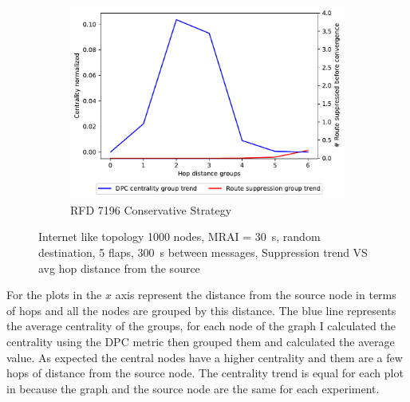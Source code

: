 \begin{figure}[h]
     \hfill
     \begin{subfigure}[b]{0.49\textwidth}
         \centering
         \includegraphics[width=\textwidth]{images/RFD/miceVSelephants/mice/cisco_1000_RFD_7196_conservative_nodeConvergence_centVSsup_trend.pdf}
         \caption{RFD 7196 Conservative Strategy}
         \label{fig:1000_7196RFDC_centVSsup}
     \end{subfigure}
		\caption{Internet like topology \num{1000} nodes, \ac{MRAI} = \SI{30}{\second},
		random destination, \num{5} flaps, \SI{300}{\second} between messages,
		Suppression trend VS avg hop distance from the source}
        \label{fig:1000_RFD_centVSsup}
\end{figure}

For the plots in  the $x$ axis represent the distance
from the source node in terms of hops and all the nodes are grouped by this
distance.
The blue line represents the average centrality of the groups, for each node of the
graph I calculated the centrality using the \ac{DPC} metric then grouped them
and calculated the average value.
As expected the central nodes have a higher centrality and them are a few hops
of distance
from the source node.
The centrality trend is equal for each plot in 
because the graph and the source node are the same for each experiment.

